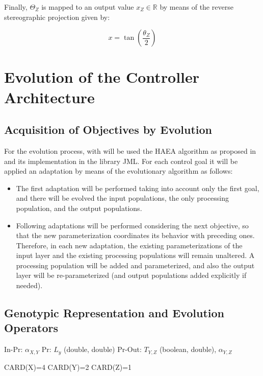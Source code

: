 Finally, $\Theta_Z$ is mapped to an output value $x_Z \in \mathbb{R}$
by means of the reverse stereographic projection given by:

\begin{equation}
  \label{eq:eqn-outval}
  x=\tan(\frac{\theta_Z}{2})
\end{equation}

\section{Evolution of the Controller Architecture}
\label{sec:chp3-evolution}
\subsection{Acquisition of Objectives by Evolution}
For the evolution process, with will be used the HAEA algorithm as
proposed in \cite{JonantanHaea} and its implementation in the library
JML. For each control goal it will be applied an adaptation by means
of the evolutionary algorithm as follows:

\begin{itemize}
\item The first adaptation will be performed taking into account only
  the first goal, and there will be evolved the input populations, the
  only processing population, and the output populations.

\item Following adaptations will be performed considering the next
  objective, so that the new parameterization coordinates its behavior
  with preceding ones. Therefore, in each new adaptation, the existing
  parameterizations of the input layer and the existing processing
  populations will remain unaltered. A processing population will be
  added and parameterized, and also the output layer will be
  re-parameterized (and output populations added explicitly if
  needed).
\end{itemize}

\subsection{Genotypic Representation and Evolution Operators}

In-Pr: $\alpha_{X,Y}$ %
Pr: $L_y$ (double, double) %
Pr-Out: $T_{Y,Z}$ (boolean, double), $\alpha_{Y,Z}$

CARD(X)=4
CARD(Y)=2
CARD(Z)=1

